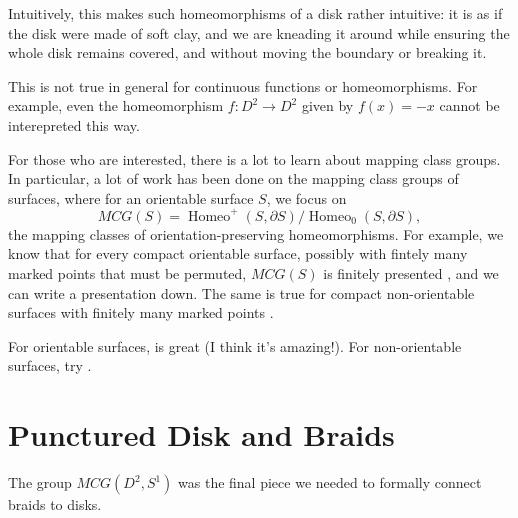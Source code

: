 \documentclass{amsart}
\DeclareMathOperator{\Homeo}{Homeo}
\begin{document}
Intuitively, this makes such homeomorphisms of a disk rather intuitive: it is
as if the disk were made of soft clay, and we are kneading it around while
ensuring the whole disk remains covered, and without moving the boundary or
breaking it.

This is not true in general for continuous functions or homeomorphisms. For
example, even the homeomorphism \(f: D^2\to D^2\) given by \(f(x) = -x\) cannot
be interepreted this way.

\begin{remark}
   For those who are interested, there is a lot to learn about mapping class
	groups. In particular, a lot of
	work has been done on the mapping class groups of surfaces, where for an
	orientable surface \(S\), we focus on 
	\[
	   MCG(S) = \Homeo^+(S, \partial S) / \Homeo_0(S, \partial S),
	\] 
	the mapping classes of orientation-preserving homeomorphisms. For
	example, we know that for every compact orientable surface, possibly with
	fintely many marked points that must be permuted, \(MCG(S)\) is
	finitely presented {\cite[p.~137]{primer}}, and we can write a presentation
	down. The same is true for compact non-orientable surfaces with
	finitely many marked points {\cite{korkmaz2002}}.

	For orientable surfaces, \cite{primer} is great (I think it's amazing!).
	For non-orientable surfaces, try
	\cite{paris2014}.
\end{remark}

\section{Punctured Disk and Braids}\label{punctured-disk-and-braids}
The group \(MCG(D^2, S^1)\) was the final piece we needed to formally connect
braids to disks.
\end{document}
